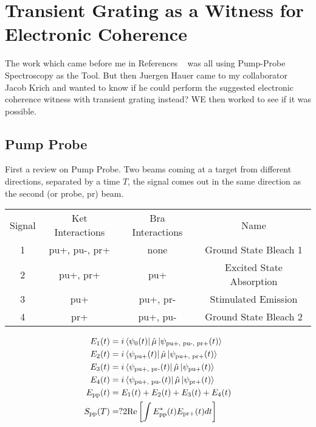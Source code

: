 \section{Transient Grating as a Witness for Electronic Coherence}
The work which came before me in References ~\cite{witness,allanWitness} was all using Pump-Probe Spectroscopy as the Tool.  But then Juergen Hauer came to my collaborator Jacob Krich and wanted to know if he could perform the suggested electronic coherence witness with transient grating instead?  WE then worked to see if it was possible.



\subsection{Pump Probe}
First a review on Pump Probe.  Two beams coming at a target from different directions, separated by a time $T$, the signal comes out in the same direction as the second (or probe, pr) beam.

\begin{tabular}{cccc}
Signal & Ket Interactions & Bra Interactions & Name \\
1 & pu+, pu-, pr+ & none & Ground State Bleach 1 \\
2 & pu+, pr+ & pu+ & Excited State Absorption \\
3 & pu+ & pu+, pr- & Stimulated Emission \\
4 & pr+ & pu+, pu- & Ground State Bleach 2
\end{tabular}

\begin{align}
	E_1 (t) &=  i \bra{\psi_{0} (t)} \hat{\mu} \ket{\psi_{\text{pu+, pu-, pr+}} (t)}\\
	E_2 (t) &=  i \bra{\psi_{\text{pu+}} (t)} \hat{\mu} \ket{\psi_{\text{pu+, pr+}} (t)}\\
	E_3 (t) &=  i \bra{\psi_{\text{pu+, pr-}} (t)} \hat{\mu} \ket{\psi_{\text{pu+}} (t)}\\
	E_4 (t) &=  i \bra{\psi_{\text{pu+, pu-}} (t)} \hat{\mu} \ket{\psi_{\text{pr+}} (t)} \\
	E_{\text{pp}} (t) &= E_1(t)  + E_2(t)  + E_3(t)  + E_4(t)  \\
	S_{\text{pp}} (T) &=? 2 \text{Re} \left[ \int E^*_{\text{pp}} (t) E_{\text{pr+}} (t) dt  \right]
\end{align}
